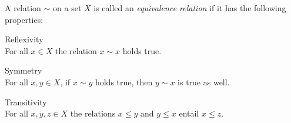 \begin{definition}
  A relation $\sim$ on a set $X$ is called an \emph{equivalence relation}
  if it has the following properties: 
  \begin{axiomlist}[E]
  \item\label{axiom:equivalence-relation-reflexivity} \textup{Reflexivity}\\
     For all $x\in X$ the relation $x \sim x$ holds true. 
  \item\label{axiom:equivalence-relation-symmetry} \textup{Symmetry}\\
     For all $x,y \in X$, if $x \sim y$ holds true, then $y \sim x$ is true as well. 
  \item\label{axiom:equivalence-relation-transitivity} \textup{Transitivity}\\
     For all $x,y,z \in X$ the relations $x\leq y$ and $y \leq x$ 
     entail $x\leq z$.
  \end{axiomlist}
\end{definition}

